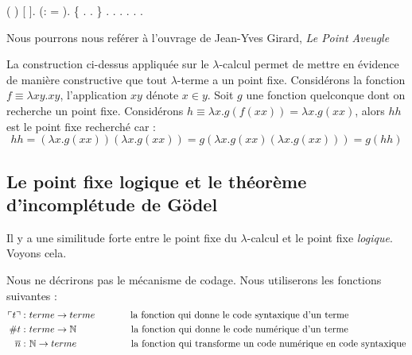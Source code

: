  \begin{coqdoccode}
\coqdocindent{2.00em}
 ( )  [ ].\coqdoceol
\coqdocindent{2.00em}
 (:   =   ).\coqdoceol
\coqdocindent{2.00em}
\{\coqdoceol
\coqdocindent{4.00em}
 . .\coqdoceol
\coqdocindent{2.00em}
\}\coqdoceol
\coqdocindent{2.00em}
   .\coqdoceol
\coqdocindent{2.00em}
   .\coqdoceol
\coqdocindent{2.00em}
   .\coqdoceol
\coqdocindent{2.00em}
.\coqdoceol
\coqdocnoindent
{}.\coqdoceol
\coqdocemptyline
\coqdocnoindent
{} .\coqdoceol
\end{coqdoccode}

Nous pourrons nous reférer à l'ouvrage de Jean-Yves Girard, \textit{Le Point Aveugle}
\cite{girard}

La construction ci-dessus appliquée sur le $\lambda$-calcul permet de mettre en évidence de 
manière constructive que tout $\lambda$-terme a un point fixe.
Considérons la fonction $f \equiv \lambda xy.xy$, l'application $xy$ dénote $x \in y$.
Soit $g$ une fonction quelconque dont on recherche un point fixe.
Considérons $h\equiv \lambda x.g(f (x x))=\lambda x.g(x x)$, alors $h h$ est 
le point fixe recherché car :
$$
hh=(\lambda x.g(xx))(\lambda x.g(xx))=g(\lambda x.g(xx)(\lambda x.g(xx)))=g(hh)
$$

\subsection{Le point fixe logique et le théorème d'incomplétude de Gödel} %
Il y a une similitude forte entre le point fixe du $\lambda$-calcul et le point fixe \textit{logique}. Voyons cela.

Nous ne décrirons pas le mécanisme de codage. 
Nous utiliserons les fonctions suivantes :
\begin{align*}
\ulcorner t  \urcorner :& \  terme \rightarrow terme \hspace{1.3cm} \text{la fonction qui donne le code syntaxique d'un terme}\\
\#  t :& \  terme \rightarrow \mathbb{N} \hspace{2cm} \text{la fonction qui donne le code numérique d'un terme}\\
\overline{  n } :& \  \mathbb{N} \rightarrow terme \hspace{2cm}  \text{la fonction qui transforme un code numérique
 en code syntaxique}
\end{align*}

